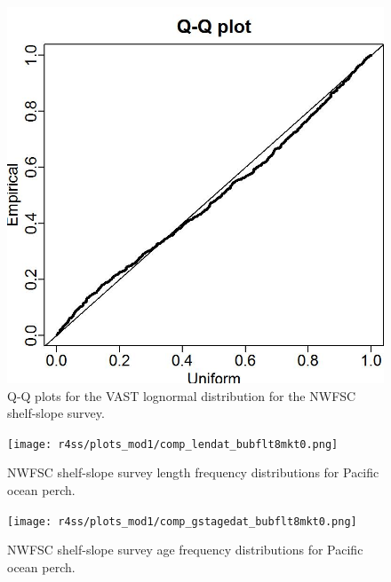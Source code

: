 \documentclass[12pt,]{article}
\begin{document}
\FloatBarrier

\begin{figure}
\centering
\includegraphics{Figures/Q-Q_plot_combo.jpg}
\caption{Q-Q plots for the VAST lognormal distribution for the NWFSC
shelf-slope survey. \label{fig:nw_qq}}
\end{figure}

\FloatBarrier

\begin{figure}
\centering
\texttt{[image: r4ss/plots\_mod1/comp\_lendat\_bubflt8mkt0.png]}
\caption{NWFSC shelf-slope survey length frequency distributions for
Pacific ocean perch. \label{fig:nw_Length}}
\end{figure}

\FloatBarrier

\begin{figure}
\centering
\texttt{[image: r4ss/plots\_mod1/comp\_gstagedat\_bubflt8mkt0.png]}
\caption{NWFSC shelf-slope survey age frequency distributions for
Pacific ocean perch. \label{fig:nw_Age}}
\end{figure}

\FloatBarrier
\end{document}

